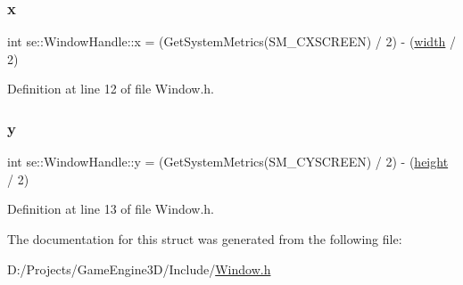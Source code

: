 \mbox{\label{structse_1_1_window_handle_a10cdc1524da4df60951578858b66901d}} 
\subsubsection{\texorpdfstring{x}{x}}
{\footnotesize\ttfamily int se\+::\+Window\+Handle\+::x = (Get\+System\+Metrics(S\+M\+\_\+\+C\+X\+S\+C\+R\+E\+EN) / 2) -\/ (\mbox{\hyperlink{structse_1_1_window_handle_a66814701369b6e581dcaa3d3ac468f5e}{width}} / 2)}



Definition at line 12 of file Window.\+h.

\mbox{\label{structse_1_1_window_handle_a49c3cce4b0181f39e5b8443acee2083a}} 
\subsubsection{\texorpdfstring{y}{y}}
{\footnotesize\ttfamily int se\+::\+Window\+Handle\+::y = (Get\+System\+Metrics(S\+M\+\_\+\+C\+Y\+S\+C\+R\+E\+EN) / 2) -\/ (\mbox{\hyperlink{structse_1_1_window_handle_a15729c4003be289e00604856310d988b}{height}} / 2)}



Definition at line 13 of file Window.\+h.



The documentation for this struct was generated from the following file\+:\begin{DoxyCompactItemize}
\item 
D\+:/\+Projects/\+Game\+Engine3\+D/\+Include/\mbox{\hyperlink{_window_8h}{Window.\+h}}\end{DoxyCompactItemize}

